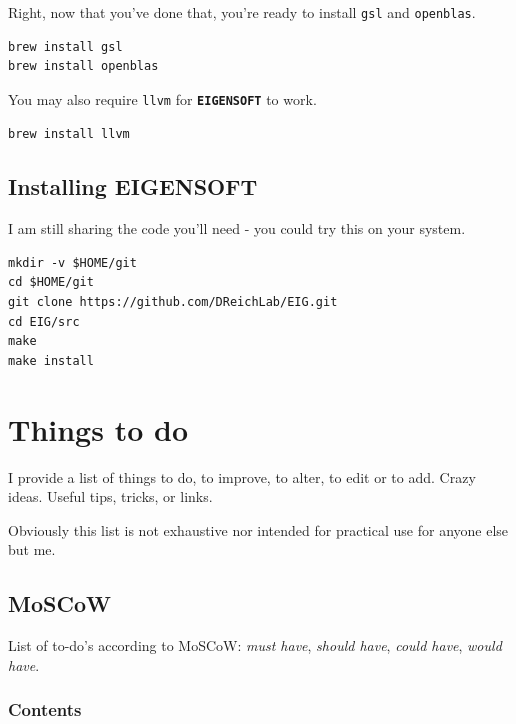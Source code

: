 \documentclass[
]{book}
\newcommand{\passthrough}[1]{#1}
\begin{document}
Right, now that you've done that, you're ready to install \passthrough{\lstinline!gsl!} and \passthrough{\lstinline!openblas!}.

\begin{lstlisting}
brew install gsl
brew install openblas
\end{lstlisting}

You may also require \passthrough{\lstinline!llvm!} for \textbf{\passthrough{\lstinline!EIGENSOFT!}} to work.

\begin{lstlisting}
brew install llvm
\end{lstlisting}

\hypertarget{installing-eigensoft}{%
\section{Installing EIGENSOFT}\label{installing-eigensoft}}

I am still sharing the code you'll need - you could try this on your system.

\begin{lstlisting}
mkdir -v $HOME/git
cd $HOME/git
git clone https://github.com/DReichLab/EIG.git
cd EIG/src
make
make install
\end{lstlisting}

\hypertarget{todo}{%
\chapter{Things to do}\label{todo}}

I provide a list of things to do, to improve, to alter, to edit or to add. Crazy ideas. Useful tips, tricks, or links.

Obviously this list is not exhaustive nor intended for practical use for anyone else but me.

\hypertarget{moscow}{%
\section{MoSCoW}\label{moscow}}

List of to-do's according to MoSCoW: \emph{must have}, \emph{should have}, \emph{could have}, \emph{would have}.

\hypertarget{contents}{%
\subsection{Contents}\label{contents}}
\end{document}
